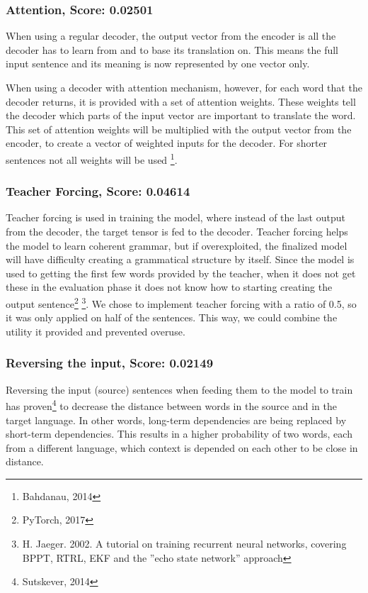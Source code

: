 \documentclass[11pt]{article}
\begin{document}
\subsubsection*{Attention, Score: 0.02501}
When using a regular decoder, the output vector from the encoder is all the decoder has to learn from and to base its translation on. This means the full input sentence and its meaning is now represented by one vector only.

When using a decoder with attention mechanism, however, for each word that the decoder returns, it is provided with a set of attention weights. These weights tell the decoder which parts of the input vector are important to translate the word. This set of attention weights will be multiplied with the output vector from the encoder, to create a vector of weighted inputs for the decoder. For shorter sentences not all weights will be used \footnote[7]{Bahdanau, 2014}. 

\subsubsection*{Teacher Forcing, Score: 0.04614}
Teacher forcing is used in training the model, where instead of the last output from the decoder, the target tensor is fed to the decoder. Teacher forcing helps the model to learn coherent grammar, but if overexploited, the finalized model will have difficulty creating a grammatical structure by itself. Since the model is used to getting the first few words provided by the teacher, when it does not get these in the evaluation phase it does not know how to starting creating the output sentence\footnote[8]{PyTorch, 2017} \footnote[9]{ H. Jaeger. 2002. A tutorial on training recurrent neural networks, covering BPPT, RTRL, EKF and the ”echo state network” approach}. We chose to implement teacher forcing with a ratio of 0.5, so it was only applied on half of the sentences. This way, we could combine the utility it provided and prevented overuse.

\subsubsection*{Reversing the input, Score: 0.02149}
Reversing the input (source) sentences when feeding them to the model to train has proven\footnote[10]{Sutskever, 2014} to decrease the distance between words in the source and in the target language. In other words, long-term dependencies are being replaced by short-term dependencies. This results in a higher probability of two words, each from a different language, which context is depended on each other to be close in distance.
\end{document}
